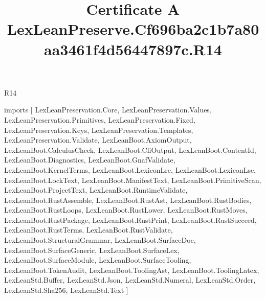 \begin{lexlean}{R14}
\title{Certificate A LexLeanPreserve.Cf696ba2c1b7a80aa3461f4d56447897c.R14}
\begin{coremodule}
imports [
  LexLeanPreservation.Core,
  LexLeanPreservation.Values,
  LexLeanPreservation.Primitives,
  LexLeanPreservation.Fixed,
  LexLeanPreservation.Keys,
  LexLeanPreservation.Templates,
  LexLeanPreservation.Validate,
  LexLeanBoot.AxiomOutput,
  LexLeanBoot.CalculusCheck,
  LexLeanBoot.CliOutput,
  LexLeanBoot.ContentId,
  LexLeanBoot.Diagnostics,
  LexLeanBoot.GnafValidate,
  LexLeanBoot.KernelTerms,
  LexLeanBoot.LexiconLre,
  LexLeanBoot.LexiconLse,
  LexLeanBoot.LockText,
  LexLeanBoot.ManifestText,
  LexLeanBoot.PrimitiveScan,
  LexLeanBoot.ProjectText,
  LexLeanBoot.RuntimeValidate,
  LexLeanBoot.RustAssemble,
  LexLeanBoot.RustAst,
  LexLeanBoot.RustBodies,
  LexLeanBoot.RustLoops,
  LexLeanBoot.RustLower,
  LexLeanBoot.RustMoves,
  LexLeanBoot.RustPackage,
  LexLeanBoot.RustPrint,
  LexLeanBoot.RustSucceed,
  LexLeanBoot.RustTerms,
  LexLeanBoot.RustValidate,
  LexLeanBoot.StructuralGrammar,
  LexLeanBoot.SurfaceDoc,
  LexLeanBoot.SurfaceGeneric,
  LexLeanBoot.SurfaceLex,
  LexLeanBoot.SurfaceModule,
  LexLeanBoot.SurfaceTooling,
  LexLeanBoot.TokenAudit,
  LexLeanBoot.ToolingAst,
  LexLeanBoot.ToolingLatex,
  LexLeanStd.Buffer,
  LexLeanStd.Json,
  LexLeanStd.Numeral,
  LexLeanStd.Order,
  LexLeanStd.Sha256,
  LexLeanStd.Text
]


\end{coremodule}
\end{lexlean}

